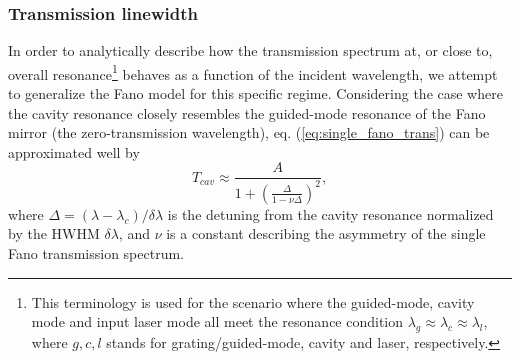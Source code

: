 \subsubsection{Transmission linewidth}\label{sec:single_fano_cavity_trans_linewidth}

In order to analytically describe how the transmission spectrum at, or close to, overall resonance\footnote{This terminology is used for the scenario where the guided-mode, cavity mode and input laser mode all meet the resonance condition $\lambda_g \approx \lambda_c \approx \lambda_l$, where $g,c,l$ stands for grating/guided-mode, cavity and laser, respectively.} behaves as a function of the incident wavelength, we attempt to generalize the Fano model for this specific regime. Considering the case where the cavity resonance closely resembles the guided-mode resonance of the Fano mirror (the zero-transmission wavelength), eq. (\ref{eq:single_fano_trans}) can be approximated well by
\begin{equation}
    T_{cav} \approx \frac{A}{1 + \left( \frac{\Delta}{1 - \nu \Delta} \right)^2},
    \label{eq:general_fano_model}
\end{equation}
where $\Delta = (\lambda - \lambda_c) / \delta \lambda$ is the detuning from the cavity resonance normalized by the HWHM $\delta \lambda$, and $\nu$ is a constant describing the asymmetry of the single Fano transmission spectrum. 

